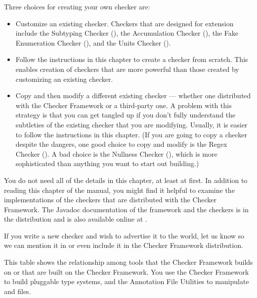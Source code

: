 Three choices for creating your own checker are:
\begin{itemize}
\item
  Customize an existing checker.
  Checkers that are designed for extension include
  the Subtyping Checker (),
  the Accumulation Checker (),
  the Fake Enumeration Checker (),
  and the Units Checker ().
\item
  Follow the instructions in this chapter to create a checker from scratch.
  This enables creation of checkers that are more powerful than those
  created by customizing an existing checker.
\item
  Copy and then modify a different existing checker --- whether
  one distributed with the Checker Framework or a third-party one.
  A problem with this strategy is that you can get tangled up if you don't fully understand
  the subtleties of the existing checker that you are modifying.
  Usually, it is easier to follow the instructions in this chapter.
  (If you are going to copy a checker despite the dangers, one good choice to copy and modify
  is the Regex Checker ().  A bad choice is
  the Nullness Checker (),
  which is more sophisticated than anything you want to start out building.)
\end{itemize}

You do not need all of the details in this chapter, at least at first.
In addition to reading this chapter of the manual, you might find it helpful
to examine the implementations of the checkers that are distributed with
the Checker Framework.
The Javadoc documentation of the framework and the checkers is in the
distribution and is also available online at
.

If you write a new checker and wish to advertise it to the world, let us
know so we can mention it in 
or even include it in the Checker Framework distribution.



This table shows the relationship among tools that the Checker Framework
builds on or that are built on the Checker Framework.
You use the Checker Framework to build pluggable type systems, and the
Annotation File Utilities to manipulate  and  files.

